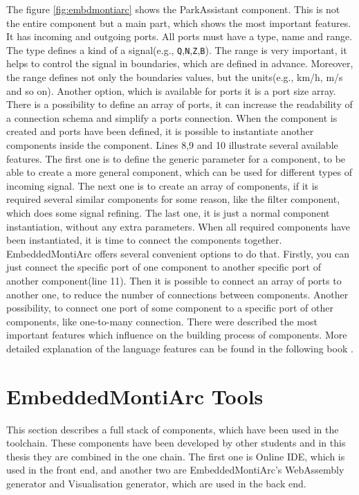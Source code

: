 The figure \ref{fig:embdmontiarc} shows the ParkAssistant component. This is not the entire component but a main part, which shows the most important features. It has incoming and outgoing ports. All ports must have a type, name and range. The type defines a kind of a signal(e.g., \texttt{Q},\texttt{N},\texttt{Z},\texttt{B}). The range is very important, it helps to control the signal in boundaries, which are defined in advance. Moreover, the range defines not only the boundaries values, but the units(e.g., km/h, m/s and so on). Another option, which is available for ports it is a port size array. There is a possibility to define an array of ports, it can increase the readability of a connection schema and simplify a ports connection. When the component is created and ports have been defined, it is possible to instantiate another components inside the component. Lines 8,9 and 10 illustrate several available features. The first one is to define the generic parameter for a component, to be able to create a more general component, which can be used for different types of incoming signal. The next one is to create an array of components, if it is required several similar components for some reason, like the filter component, which does some signal refining. The last one, it is just a normal component instantiation, without any extra parameters. When all required components have been instantiated, it is time to connect the components together. EmbeddedMontiArc offers several convenient options to do that. Firstly, you can just connect the specific port of one component to another specific port of another component(line 11). Then it is possible to connect an array of ports to another one, to reduce the number of connections between components. Another possibility, to connect one port of some component to a specific port of other components, like one-to-many connection. There were described the most important features which influence on the building process of components. More detailed explanation of the language features can be found in the following book \cite{Mon10}.

\section{EmbeddedMontiArc Tools} \label{sec:tools}
This section describes a full stack of components, which have been used in the toolchain. These components have been developed by other students and in this thesis they are combined in the one chain. The first one is Online IDE, which is used in the front end, and another two are EmbeddedMontiArc's WebAssembly generator and Visualisation generator, which are used in the back end.

